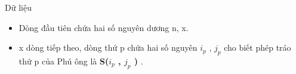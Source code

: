 Dữ liệu
\begin{itemize}
	\item Dòng đầu tiên chứa hai số nguyên dương n, x.
	\item x dòng tiếp theo, dòng thứ p chứa hai số nguyên $i_{p}$ , $j_{p}$ cho biết phép tráo thứ p của Phú ông là \textbf{ S($i_{p}$ , $j_{p}$ ) } .
\end{itemize}